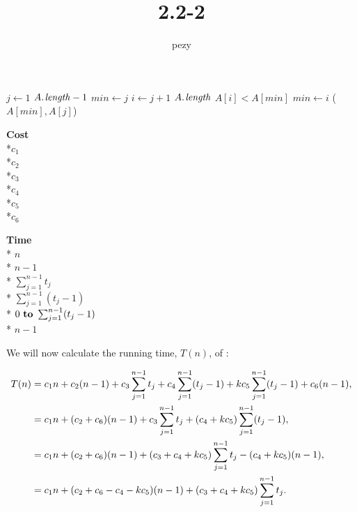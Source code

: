 \documentclass[twoside]{article}
\begin{document}
	\title{2.2-2}
	\author{pezy}
	\maketitle
	\begin{multicols}{3}
		\begin{codebox}
			\li \For $j \gets 1$ \To $\attrib{A}{length} - 1$
			\li \Do	$min \gets j$
			\li		\For $i \gets j + 1$ \To $\attrib{A}{length}$
			\li			\Do \If $A[i] < A[min]$	
			\li					\Do $min \gets i$ 
			\End
			\End
			\li			{}($A[min], A[j]$)
			\End
		\end{codebox}
		
		\columnbreak
		
		\begin{center}	%
			\textbf{\large Cost}
			\\*$c_{1}$
			\\*$c_{2}$
			\\*$c_{3}$
			\\*$c_{4}$
			\\*$c_{5}$
			\\*$c_{6}$
		\end{center}
		
		\columnbreak
		
		\begin{flushleft} %
			\textbf{\large Time}
			\\* $n$
			\\* $n-1$
			\\* $\sum _{ j=1 }^{ n-1 } t_j $
			\\* $\sum _{ j=1 }^{ n-1 } (t_j - 1) $
			\\* $0 \To \sum _{ j=1 }^{ n-1 } (t_j - 1)$
			\\* $n-1$
		\end{flushleft}
	\end{multicols}
	
	We will now calculate the running time, $T(n)$,  of :
	
	\begin{align}
	\notag
	T(n) &= c_1 n +  c_2 (n-1) + c_3 \sum _{j=1}^{n-1}  t_j + c_4 \sum _{j=1}^{n-1} ( t_j -1 ) + k c_5 \sum _{j=1}^{n-1}  (t_j -1)  + c_6 (n-1),\\
	\notag
	&= c_1 n+ (c_2 + c_6)(n-1) + c_3 \sum _{j=1}^{n-1}  t_j + (c_4 + k c_5) \sum _{j=1}^{n-1}  (t_j -1),\\
	\notag
	&= c_1 n+ (c_2 + c_6)(n-1) + (c_3 + c_4 + k c_5 ) \sum _{j=1}^{n-1}  t_j - (c_4 + k c_5) (n-1),\\
	\label{eq:Tn}
	&= c_1 n +(c_2 + c_6 - c_4 - k c_5) (n-1) + (c_3 + c_4 + k c_5 ) \sum _{j=1}^{n-1}  t_j.
	\end{align}
	
\end{document}
